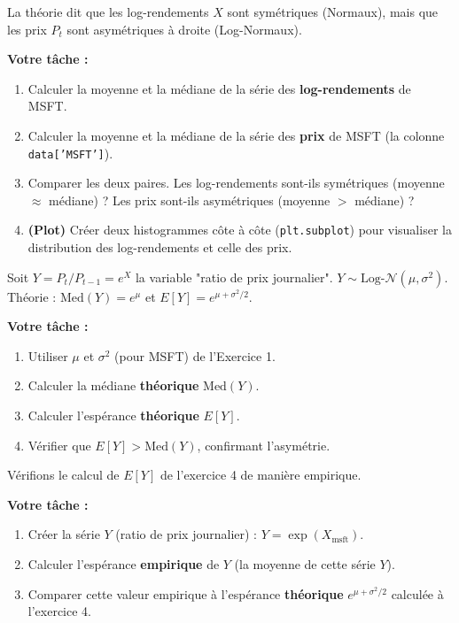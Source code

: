 \begin{exercicebox}
La théorie dit que les log-rendements $X$ sont symétriques (Normaux), mais que les prix $P_t$ sont asymétriques à droite (Log-Normaux).

\textbf{Votre tâche :}
\begin{enumerate}
    \item Calculer la moyenne et la médiane de la série des \textbf{log-rendements} de MSFT.
    \item Calculer la moyenne et la médiane de la série des \textbf{prix} de MSFT (la colonne \texttt{data['MSFT']}).
    \item Comparer les deux paires. Les log-rendements sont-ils symétriques (moyenne $\approx$ médiane) ? Les prix sont-ils asymétriques (moyenne $>$ médiane) ?
    \item \textbf{(Plot)} Créer deux histogrammes côte à côte (\texttt{plt.subplot}) pour visualiser la distribution des log-rendements et celle des prix.
\end{enumerate}
\end{exercicebox}

\begin{exercicebox}
Soit $Y = P_t/P_{t-1} = e^X$ la variable "ratio de prix journalier". $Y \sim \text{Log-}\mathcal{N}(\mu, \sigma^2)$.
Théorie : $\text{Med}(Y) = e^{\mu}$ et $E[Y] = e^{\mu + \sigma^2/2}$.

\textbf{Votre tâche :}
\begin{enumerate}
    \item Utiliser $\mu$ et $\sigma^2$ (pour MSFT) de l'Exercice 1.
    \item Calculer la médiane \textbf{théorique} $\text{Med}(Y)$.
    \item Calculer l'espérance \textbf{théorique} $E[Y]$.
    \item Vérifier que $E[Y] > \text{Med}(Y)$, confirmant l'asymétrie.
\end{enumerate}
\end{exercicebox}

\begin{exercicebox}
Vérifions le calcul de $E[Y]$ de l'exercice 4 de manière empirique.

\textbf{Votre tâche :}
\begin{enumerate}
    \item Créer la série $Y$ (ratio de prix journalier) : $Y = \exp(X_{\text{msft}})$.
    \item Calculer l'espérance \textbf{empirique} de $Y$ (la moyenne de cette série $Y$).
    \item Comparer cette valeur empirique à l'espérance \textbf{théorique} $e^{\mu + \sigma^2/2}$ calculée à l'exercice 4.
\end{enumerate}
\end{exercicebox}

